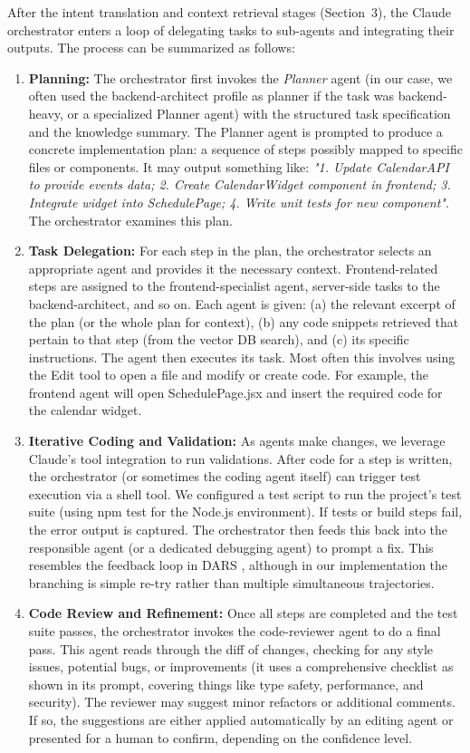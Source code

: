 \documentclass[11pt]{article}
\begin{document}
After the intent translation and context retrieval stages (Section~3), the Claude orchestrator enters a loop of delegating tasks to sub-agents and integrating their outputs. The process can be summarized as follows:

\begin{enumerate}
\item \textbf{Planning:} The orchestrator first invokes the \textit{Planner} agent (in our case, we often used the backend-architect profile as planner if the task was backend-heavy, or a specialized Planner agent) with the structured task specification and the knowledge summary. The Planner agent is prompted to produce a concrete implementation plan: a sequence of steps possibly mapped to specific files or components. It may output something like: \emph{"1. Update CalendarAPI to provide events data; 2. Create CalendarWidget component in frontend; 3. Integrate widget into SchedulePage; 4. Write unit tests for new component"}. The orchestrator examines this plan.
\item \textbf{Task Delegation:} For each step in the plan, the orchestrator selects an appropriate agent and provides it the necessary context. Frontend-related steps are assigned to the frontend-specialist agent, server-side tasks to the backend-architect, and so on. Each agent is given: (a) the relevant excerpt of the plan (or the whole plan for context), (b) any code snippets retrieved that pertain to that step (from the vector DB search), and (c) its specific instructions. The agent then executes its task. Most often this involves using the Edit tool to open a file and modify or create code. For example, the frontend agent will open SchedulePage.jsx and insert the required code for the calendar widget.
\item \textbf{Iterative Coding and Validation:} As agents make changes, we leverage Claude's tool integration to run validations. After code for a step is written, the orchestrator (or sometimes the coding agent itself) can trigger test execution via a shell tool. We configured a test script to run the project's test suite (using npm test for the Node.js environment). If tests or build steps fail, the error output is captured. The orchestrator then feeds this back into the responsible agent (or a dedicated debugging agent) to prompt a fix. This resembles the feedback loop in DARS \cite{dars2025}, although in our implementation the branching is simple re-try rather than multiple simultaneous trajectories.
\item \textbf{Code Review and Refinement:} Once all steps are completed and the test suite passes, the orchestrator invokes the code-reviewer agent to do a final pass. This agent reads through the diff of changes, checking for any style issues, potential bugs, or improvements (it uses a comprehensive checklist as shown in its prompt, covering things like type safety, performance, and security). The reviewer may suggest minor refactors or additional comments. If so, the suggestions are either applied automatically by an editing agent or presented for a human to confirm, depending on the confidence level.

\end{enumerate}
\end{document}
